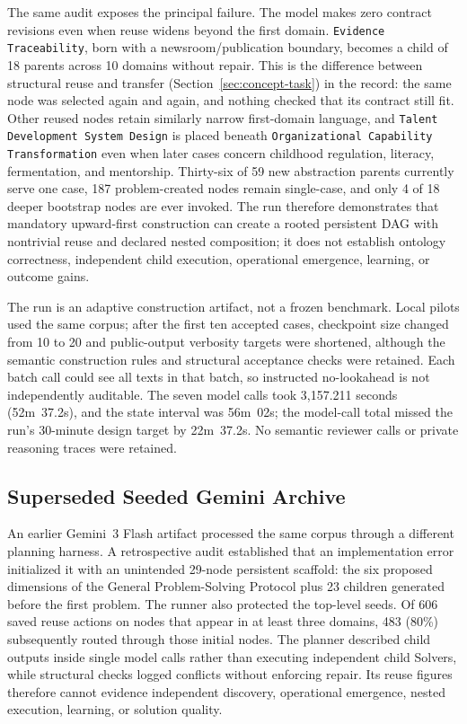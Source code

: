 \documentclass[11pt]{article}
\let\oldtexttt\texttt
\renewcommand{\texttt}[1]{\oldtexttt{\small #1}}
\begin{document}
The same audit exposes the principal failure. The model makes zero contract revisions even when reuse widens beyond the first domain. \texttt{Evidence Traceability}, born with a newsroom/publication boundary, becomes a child of 18 parents across 10 domains without repair. This is the difference between structural reuse and transfer (Section~\ref{sec:concept-task}) in the record: the same node was selected again and again, and nothing checked that its contract still fit. Other reused nodes retain similarly narrow first-domain language, and \texttt{Talent Development System Design} is placed beneath \texttt{Organizational Capability Transformation} even when later cases concern childhood regulation, literacy, fermentation, and mentorship. Thirty-six of 59 new abstraction parents currently serve one case, 187 problem-created nodes remain single-case, and only 4 of 18 deeper bootstrap nodes are ever invoked. The run therefore demonstrates that mandatory upward-first construction can create a rooted persistent DAG with nontrivial reuse and declared nested composition; it does not establish ontology correctness, independent child execution, operational emergence, learning, or outcome gains.

The run is an adaptive construction artifact, not a frozen benchmark. Local pilots used the same corpus; after the first ten accepted cases, checkpoint size changed from 10 to 20 and public-output verbosity targets were shortened, although the semantic construction rules and structural acceptance checks were retained. Each batch call could see all texts in that batch, so instructed no-lookahead is not independently auditable. The seven model calls took 3,157.211 seconds (52m~37.2s), and the state interval was 56m~02s; the model-call total missed the run's 30-minute design target by 22m~37.2s. No semantic reviewer calls or private reasoning traces were retained.

\subsection{Superseded Seeded Gemini Archive}
\label{sec:gemini-archive}

An earlier Gemini~3 Flash artifact processed the same corpus through a different planning harness. A retrospective audit established that an implementation error initialized it with an unintended 29-node persistent scaffold: the six proposed dimensions of the General Problem-Solving Protocol plus 23 children generated before the first problem. The runner also protected the top-level seeds. Of 606 saved reuse actions on nodes that appear in at least three domains, 483 (80\%) subsequently routed through those initial nodes. The planner described child outputs inside single model calls rather than executing independent child Solvers, while structural checks logged conflicts without enforcing repair. Its reuse figures therefore cannot evidence independent discovery, operational emergence, nested execution, learning, or solution quality.
\end{document}
